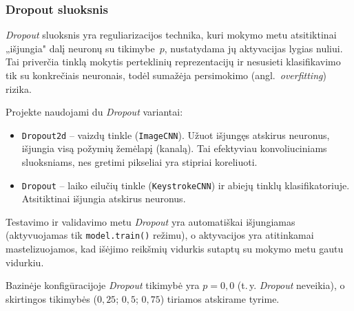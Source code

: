 \subsubsection{Dropout sluoksnis}
\label{subsubsec:dropout_sluoksnis}

\textit{Dropout} sluoksnis yra reguliarizacijos technika, kuri mokymo metu atsitiktinai „išjungia" dalį neuronų su tikimybe~$p$, nustatydama jų aktyvacijas lygias nuliui. Tai priverčia tinklą mokytis perteklinių reprezentacijų ir nesusieti klasifikavimo tik su konkrečiais neuronais, todėl sumažėja persimokimo (angl.~\textit{overfitting}) rizika.

Projekte naudojami du \textit{Dropout} variantai:
\begin{itemize}
    \item \texttt{Dropout2d} – vaizdų tinkle (\texttt{ImageCNN}). Užuot išjungęs atskirus neuronus, išjungia visą požymių žemėlapį (kanalą). Tai efektyviau konvoliuciniams sluoksniams, nes gretimi pikseliai yra stipriai koreliuoti.
    \item \texttt{Dropout} – laiko eilučių tinkle (\texttt{KeystrokeCNN}) ir abiejų tinklų klasifikatoriuje. Atsitiktinai išjungia atskirus neuronus.
\end{itemize}

Testavimo ir validavimo metu \textit{Dropout} yra automatiškai išjungiamas (aktyvuojamas tik \texttt{model.train()} režimu), o aktyvacijos yra atitinkamai mastelizuojamos, kad išėjimo reikšmių vidurkis sutaptų su mokymo metu gautu vidurkiu.

Bazinėje konfigūracijoje \textit{Dropout} tikimybė yra $p = 0{,}0$ (t.\,y. \textit{Dropout} neveikia), o skirtingos tikimybės ($0{,}25$; $0{,}5$; $0{,}75$) tiriamos atskirame tyrime.

